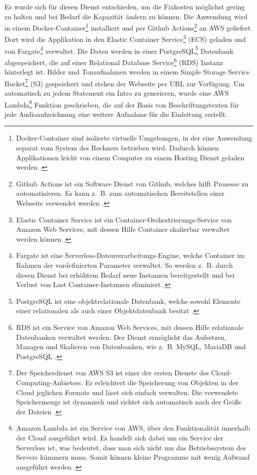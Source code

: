 Es wurde sich für diesen Dienst entschieden, um die Fixkosten möglichst gering zu halten und bei Bedarf die Kapazität ändern zu können. Die Anwendung wird in einem Docker-Container\footnote{Docker-Container sind isolierte virtuelle Umgebungen, in der eine Anwendung separat vom System des Rechners betrieben wird. Dadurch können Applikationen leicht von einem Computer zu einem Hosting Dienst geladen werden \parencite{docker_container}.} installiert und per Github Actions\footnote{Github Actions ist ein Software Dienst von Github, welches hilft Prozesse zu automatisieren. Es kann z.~B. zum automatischen Bereitstellen einer Webseite verwendet werden \parencite{github_actions}.} an AWS geliefert. Dort wird die Applikation in den Elastic Container Service\footnote{Elastic Container Service ist ein Container-Orchestrierungs-Service von Amazon Web Services, mit dessen Hilfe Container skalierbar verwaltet werden können \parencite{aws_ecs}.} (ECS) geladen und von Fargate\footnote{Fargate ist eine Serverless-Datenverarbeitungs-Engine, welche Container im Rahmen der vordefinierten Parameter verwaltet. So werden z.~B. durch diesen Dienst bei erhöhtem Bedarf neue Instanzen bereitgestellt und bei Verlust von Last Container-Instanzen eliminiert \parencite{aws_fargate}.} verwaltet. 
Die Daten werden in einer PostgreSQL\footnote{PostgreSQL ist eine objektrelationale Datenbank, welche sowohl Elemente einer relationalen als auch einer Objektdatenbank besitzt \parencite{postgresql}.} Datenbank abgespeichert, die auf einer Relational Database Service\footnote{RDS ist ein Service von Amazon Web Services, mit dessen Hilfe relationale Datenbanken verwaltet werden. Der Dienst ermöglicht das Aufsetzen, Managen und Skalieren von Datenbanken, wie z.~B. MySQL, MariaDB und PostgreSQL \parencite[vgl.][S.161 f.]{baron_aws_2016}.} (RDS) Instanz hinterlegt ist. 
Bilder und Tonaufnahmen werden in einem Simple Storage Service Bucket\footnote{Der Speicherdienst von AWS S3 ist einer der ersten Dienste des Cloud-Computing-Anbieters. Er erleichtert die Speicherung von Objekten in der Cloud jeglichen Formats und lässt sich einfach verwalten. Die verwendete Speichermenge ist dynamisch und richtet sich automatisch nach der Größe der Dateien \parencite[vgl.][S. 23]{baron_aws_2016}.} (S3) gespeichert und stehen der Webseite per URL zur Verfügung. 
Um automatisch zu jedem Statement ein Intro zu generieren, wurde eine AWS Lambda\footnote{Amazon Lambda ist ein Service von AWS, über den Funktionalität innerhalb der Cloud ausgeführt wird. Es handelt sich dabei um ein Service der Serverless ist, was bedeutet, dass man sich nicht um das Betriebssystem des Servers kümmern muss. Somit können kleine Programme mit wenig Aufwand ausgeführt werden \parencites[vgl.][Kap. 15.3]{wolff_microservices_2018}{aws_lambda}.} Funktion geschrieben, die auf der Basis von Beschriftungstexten für jede Audioaufzeichnung eine weitere Aufnahme für die Einleitung erstellt.

